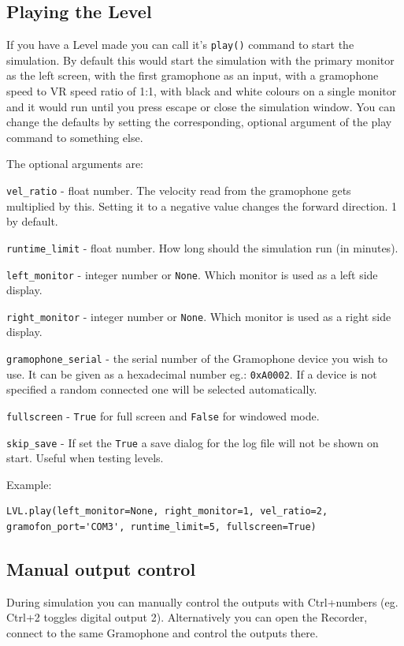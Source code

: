 \documentclass[11pt,a4paper]{article}
\newcommand{\param}[1]{\item \texttt{#1} -}
\begin{document}
\subsection{Playing the Level}
If you have a Level made you can call it's \texttt{play()} command to start the simulation. By default this would start the simulation with the primary monitor as the left screen, with the first gramophone as an input, with a gramophone speed to VR speed ratio of 1:1, with black and white colours on a single monitor and it would run until you press escape or close the simulation window. You can change the defaults by setting the corresponding, optional argument of the play command to something else.


The optional arguments are:
\begin{paramlist}

\param{vel\_ratio} float number. The velocity read from the gramophone gets multiplied by this. Setting it to a negative value changes the forward direction. 1 by default.
\param{runtime\_limit} float number. How long should the simulation run (in minutes).
\param{left\_monitor} integer number or \lstinline{None}. Which monitor is used as a left side display.
\param{right\_monitor} integer number or \lstinline{None}. Which monitor is used as a right side display.
\param{gramophone\_serial} the serial number of the Gramophone device you wish to use. It can be given as a hexadecimal number eg.: \lstinline{0xA0002}. If a device is not specified a random connected one will be selected automatically.
\param{fullscreen} \lstinline{True} for full screen and \lstinline{False} for windowed mode.
\param{skip\_save} If set the \lstinline{True} a save dialog for the log file will not be shown on start. Useful when testing levels.
\end{paramlist}


Example:

\begin{lstlisting}
LVL.play(left_monitor=None, right_monitor=1, vel_ratio=2, gramofon_port='COM3', runtime_limit=5, fullscreen=True)
\end{lstlisting}

\subsection{Manual output control}
During simulation you can manually control the outputs with Ctrl+numbers (eg. Ctrl+2 toggles digital output 2). Alternatively you can open the Recorder, connect to the same Gramophone and control the outputs there.
\end{document}
